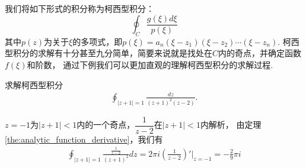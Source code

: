         我们将如下形式的积分称为柯西型积分：$$\oint_C \frac{g(\xi)d\xi}{p(\xi)}$$
        其中$p(z)$为关于$\xi$的多项式，即$p(\xi) = a_n(\xi - z_1)(\xi - z_2)\cdots(\xi - z_n)$.
        柯西型积分的求解有十分甚至九分简单，简要来说就是找处在$C$内的奇点，并确定函数$f(\xi)$和阶数，
        通过下例我们可以更加直观的理解柯西型积分的求解过程.
        \begin{example}
            求解柯西型积分
            \begin{align*}
                \oint_{|z + 1| = 1}\frac{dz}{(z + 1)^2(z - 2)}.
            \end{align*}
        \end{example}
        \begin{solution}
            $z = -1$为$|z + 1| < 1$内的一个奇点，$\dfrac{1}{z - 2}$在$|z + 1| < 1$内解析，
            由定理\ref{the:analytic_function_derivative}，我们有
            \begin{align*}
                \oint_{|z + 1| = 1}\frac{\frac{1}{z - 2}}{(z + 1)^2}dz = 2\pi i\left( \frac{1}{z - 2} \right)'\Bigg|_{z=-1} = -\frac{2}{9}\pi i
            \end{align*}
        \end{solution}
